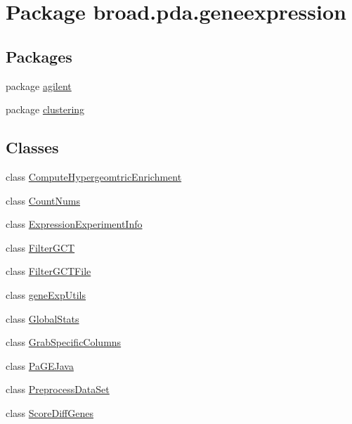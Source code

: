 \hypertarget{namespacebroad_1_1pda_1_1geneexpression}{\section{Package broad.\+pda.\+geneexpression}
\label{namespacebroad_1_1pda_1_1geneexpression}
}
\subsection*{Packages}
\begin{DoxyCompactItemize}
\item 
package \hyperlink{namespacebroad_1_1pda_1_1geneexpression_1_1agilent}{agilent}
\item 
package \hyperlink{namespacebroad_1_1pda_1_1geneexpression_1_1clustering}{clustering}
\end{DoxyCompactItemize}
\subsection*{Classes}
\begin{DoxyCompactItemize}
\item 
class \hyperlink{classbroad_1_1pda_1_1geneexpression_1_1_compute_hypergeomtric_enrichment}{Compute\+Hypergeomtric\+Enrichment}
\item 
class \hyperlink{classbroad_1_1pda_1_1geneexpression_1_1_count_nums}{Count\+Nums}
\item 
class \hyperlink{classbroad_1_1pda_1_1geneexpression_1_1_expression_experiment_info}{Expression\+Experiment\+Info}
\item 
class \hyperlink{classbroad_1_1pda_1_1geneexpression_1_1_filter_g_c_t}{Filter\+G\+C\+T}
\item 
class \hyperlink{classbroad_1_1pda_1_1geneexpression_1_1_filter_g_c_t_file}{Filter\+G\+C\+T\+File}
\item 
class \hyperlink{classbroad_1_1pda_1_1geneexpression_1_1gene_exp_utils}{gene\+Exp\+Utils}
\item 
class \hyperlink{classbroad_1_1pda_1_1geneexpression_1_1_global_stats}{Global\+Stats}
\item 
class \hyperlink{classbroad_1_1pda_1_1geneexpression_1_1_grab_specific_columns}{Grab\+Specific\+Columns}
\item 
class \hyperlink{classbroad_1_1pda_1_1geneexpression_1_1_pa_g_e_java}{Pa\+G\+E\+Java}
\item 
class \hyperlink{classbroad_1_1pda_1_1geneexpression_1_1_preprocess_data_set}{Preprocess\+Data\+Set}
\item 
class \hyperlink{classbroad_1_1pda_1_1geneexpression_1_1_score_diff_genes}{Score\+Diff\+Genes}
\end{DoxyCompactItemize}
